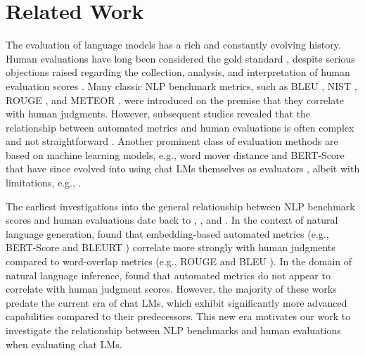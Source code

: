 \clearpage

\section{Related Work}
\label{app:sec:related_work}

The evaluation of language models has a rich and constantly evolving history. Human evaluations have long been considered the gold standard \citep{gatt2018survey,van2019best,celikyilmaz2020evaluation,roller2020opendomainconversationalagentscurrent,van2021human}, despite serious objections raised regarding the collection, analysis, and interpretation of human evaluation scores \citep{novikova2018rankme,howcroft2020twenty, bowman2021fixbenchmarkingnaturallanguage,karpinska2021perilsusingmechanicalturk, clark2021all,smith2022humanevaluationconversationsopen, gehrmann2023repairing,finch2023dontforgetabcsevaluating}. Many classic NLP benchmark metrics, such as BLEU \citep{papineni2002bleu}, NIST \citep{doddington2002nist}, ROUGE \citep{lin2004rouge}, and METEOR \citep{banerjee2005meteor}, were introduced on the premise that they correlate with human judgments. However, subsequent studies revealed that the relationship between automated metrics and human evaluations is often complex and not straightforward \citep{liu2016hownot, novikova2017we, reiter2018structured, karpinska2021perilsusingmechanicalturk}. Another prominent class of evaluation methods are based on machine learning models, e.g., word mover distance \citep{kusner2015word} and BERT-Score \citep{zhang2019bertscore} that have since evolved into using chat LMs themselves as evaluators \citep{wang2023chatgpt,zheng2024judging, chiang2023largelanguagemodelsalternative,chan2023chatevalbetterllmbasedevaluators,bavaresco2024llms,fu2024gptscore}, albeit with limitations, e.g., \citep{dorner2024limits,szymanski2024limitationsllmasajudgeapproachevaluating, thakur2024judging}.

The earliest investigations into the general relationship between NLP benchmark scores and human evaluations date back to \citet{bangalore2000evaluation}, \citet{belz2006comparing}, and \citet{liu2016hownot}. In the context of natural language generation, \citet{clinciu2021study} found that embedding-based automated metrics (e.g., BERT-Score \citep{zhang2019bertscore} and BLEURT \citet{sellam2020bleurt}) correlate more strongly with human judgments compared to word-overlap metrics (e.g., ROUGE \citep{lin2004rouge} and BLEU \citep{papineni2002bleu}). In the domain of natural language inference, \citet{schuff2021does} found that automated metrics do not appear to correlate with human judgment scores. However, the majority of these works predate the current era of chat LMs, which exhibit significantly more advanced capabilities compared to their predecessors. This new era motivates our work to investigate the relationship between NLP benchmarks and human evaluations when evaluating chat LMs.

